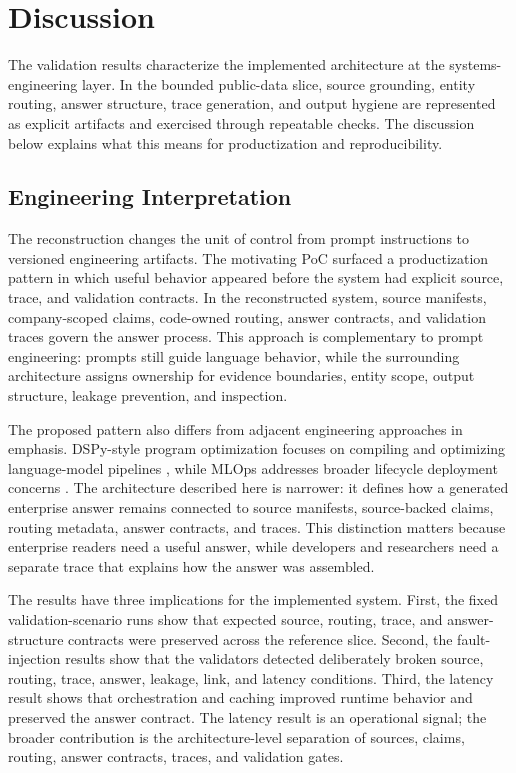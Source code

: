 \PostTableHeadingSpace
\section{Discussion}

The validation results characterize the implemented architecture at the systems-engineering layer. In the bounded public-data slice, source grounding, entity routing, answer structure, trace generation, and output hygiene are represented as explicit artifacts and exercised through repeatable checks. The discussion below explains what this means for productization and reproducibility.

\subsection{Engineering Interpretation}

The reconstruction changes the unit of control from prompt instructions to versioned engineering artifacts. The motivating PoC surfaced a productization pattern in which useful behavior appeared before the system had explicit source, trace, and validation contracts. In the reconstructed system, source manifests, company-scoped claims, code-owned routing, answer contracts, and validation traces govern the answer process. This approach is complementary to prompt engineering: prompts still guide language behavior, while the surrounding architecture assigns ownership for evidence boundaries, entity scope, output structure, leakage prevention, and inspection.

The proposed pattern also differs from adjacent engineering approaches in emphasis. DSPy-style program optimization focuses on compiling and optimizing language-model pipelines \citep{khattab2024dspy}, while MLOps addresses broader lifecycle deployment concerns \citep{kreuzberger2023mlops}. The architecture described here is narrower: it defines how a generated enterprise answer remains connected to source manifests, source-backed claims, routing metadata, answer contracts, and traces. This distinction matters because enterprise readers need a useful answer, while developers and researchers need a separate trace that explains how the answer was assembled.

The results have three implications for the implemented system. First, the fixed validation-scenario runs show that expected source, routing, trace, and answer-structure contracts were preserved across the reference slice. Second, the fault-injection results show that the validators detected deliberately broken source, routing, trace, answer, leakage, link, and latency conditions. Third, the latency result shows that orchestration and caching improved runtime behavior and preserved the answer contract. The latency result is an operational signal; the broader contribution is the architecture-level separation of sources, claims, routing, answer contracts, traces, and validation gates.

